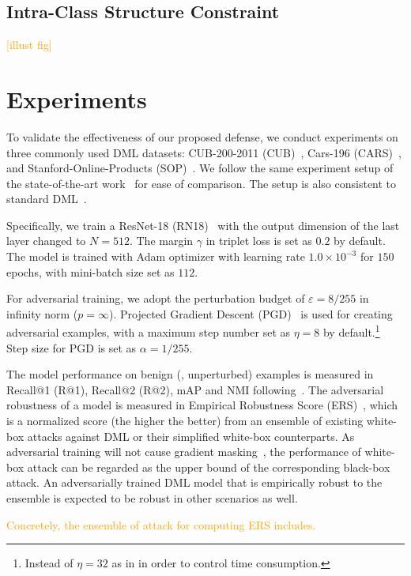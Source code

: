 \documentclass[10pt,twocolumn,letterpaper]{article}
\newcommand{\oo}[1]{\textcolor{orange}{#1}}
\begin{document}
\subsection{Intra-Class Structure Constraint}

\oo{[illust fig]}

\section{Experiments}
\label{sec:4}

To validate the effectiveness of our proposed defense, we conduct experiments
on three commonly used DML datasets: CUB-200-2011 (CUB)~\cite{cub200}, Cars-196
(CARS)~\cite{cars196}, and Stanford-Online-Products (SOP)~\cite{sop}.
%
We follow the same experiment setup of the state-of-the-art work~\cite{robrank}
for ease of comparison.
%
The setup is also consistent to standard DML~\cite{revisiting}.

Specifically, we train a ResNet-18 (RN18)~\cite{resnet} with the output dimension of
the last layer changed to $N=512$.
%
The margin $\gamma$ in triplet loss is set as $0.2$ by default.
%
The model is trained with Adam optimizer with learning rate $1.0\times 10^{-3}$
for $150$ epochs, with mini-batch size set as $112$.

For adversarial training, we adopt the perturbation budget of
$\varepsilon=8/255$ in infinity norm ($p=\infty$).
%
Projected Gradient Descent (PGD)~\cite{madry} is used for creating adversarial
examples, with a maximum step number set as $\eta=8$ by default.\footnote{
Instead of $\eta=32$ as in \cite{robrank} in order to control time consumption.}
%
Step size for PGD is set as $\alpha=1/255$.

The model performance on benign (\ie, unperturbed) examples is measured in
Recall@1 (R@1), Recall@2 (R@2), mAP and NMI
following~\cite{revisiting,robrank}.
%
The adversarial robustness of a model is measured in Empirical Robustness Score
(ERS)~\cite{robrank}, which is a normalized score (the higher the better) from
an ensemble of existing white-box attacks against DML or their simplified
white-box counterparts.
%
As adversarial training will not cause gradient masking~\cite{obfuscated},
the performance of white-box attack can be regarded as the upper bound of the
corresponding black-box attack.
%
An adversarially trained DML model that is empirically robust to the ensemble
is expected to be robust in other scenarios as well.

\oo{Concretely, the ensemble of attack for computing ERS includes.}
\end{document}
